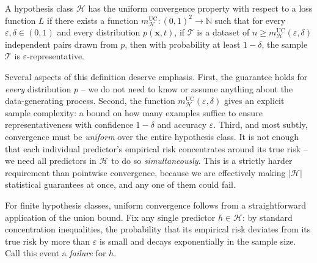 \begin{definition}
A hypothesis class $\mathcal{H}$ has the \alert{uniform convergence} property with respect to a loss function $L$ if there exists a function $m_{\mathcal{H}}^{\text{UC}}: (0,1)^2 \to \mathbb{N}$ such that 
for every $\varepsilon, \delta \in (0,1)$ and every distribution $p(\mathbf{x}, t)$, if $\mathcal{T}$ is a dataset of $n \geq m_{\mathcal{H}}^{\text{UC}}(\varepsilon, \delta)$ independent pairs drawn from $p$, then with probability at least $1 - \delta$, the sample $\mathcal{T}$ is $\varepsilon$-representative.
\end{definition}

Several aspects of this definition deserve emphasis. First, the guarantee holds for \emph{every} distribution $p$ -- we do not need to know or assume anything about the data-generating process. Second, the function $m_{\mathcal{H}}^{\text{UC}}(\varepsilon, \delta)$ gives an explicit sample complexity: a bound on how many examples suffice to ensure representativeness with confidence $1 - \delta$ and accuracy $\varepsilon$. Third, and most subtly, convergence must be \emph{uniform} over the entire hypothesis class. It is not enough that each individual predictor's empirical risk concentrates around its true risk -- we need all predictors in $\mathcal{H}$ to do so \emph{simultaneously}. This is a strictly harder requirement than pointwise convergence, because we are effectively making $|\mathcal{H}|$ statistical guarantees at once, and any one of them could fail.

%
For finite hypothesis classes, uniform convergence follows from a straightforward application of the union bound. Fix any single predictor $h \in \mathcal{H}$: by standard concentration inequalities, the probability that its empirical risk deviates from its true risk by more than $\varepsilon$ is small and decays exponentially in the sample size. Call this event a \emph{failure} for $h$.

